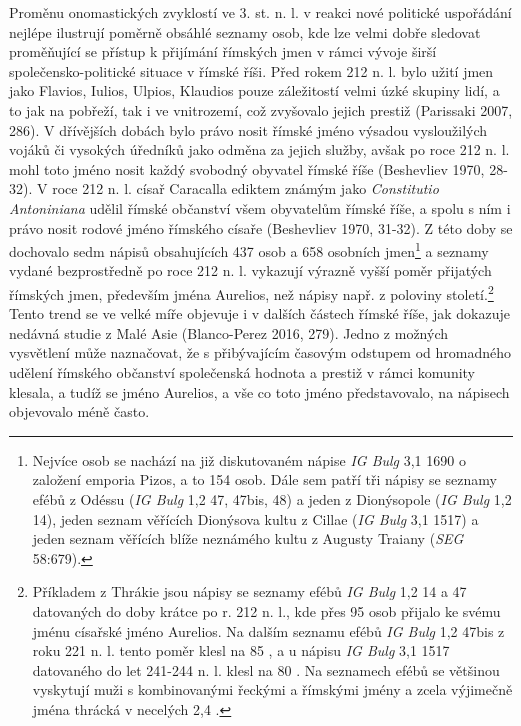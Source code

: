 Proměnu onomastických zvyklostí ve 3. st. n. l. v reakci nové politické uspořádání nejlépe ilustrují poměrně obsáhlé seznamy osob, kde lze velmi dobře sledovat proměňující se přístup k přijímání římských jmen v rámci vývoje širší společensko-politické situace v římské říši. Před rokem 212 n. l. bylo užití jmen jako Flavios, Iulios, Ulpios, Klaudios pouze záležitostí velmi úzké skupiny lidí, a to jak na pobřeží, tak i ve vnitrozemí, což zvyšovalo jejich prestiž (Parissaki 2007, 286). V dřívějších dobách bylo právo nosit římské jméno výsadou vysloužilých vojáků či vysokých úředníků jako odměna za jejich služby, avšak po roce 212 n. l. mohl toto jméno nosit každý svobodný obyvatel římské říše (Beshevliev 1970, 28-32). V roce 212 n. l. císař Caracalla ediktem známým jako {\em Constitutio Antoniniana} udělil římské občanství všem obyvatelům římské říše, a spolu s ním i právo nosit rodové jméno římského císaře (Beshevliev 1970, 31-32). Z této doby se dochovalo sedm nápisů obsahujících 437 osob a 658 osobních jmen\footnote{Nejvíce osob se nachází na již diskutovaném nápise {\em IG Bulg} 3,1 1690 o založení emporia Pizos, a to 154 osob. Dále sem patří tři nápisy se seznamy efébů z Odéssu ({\em IG Bulg} 1,2 47, 47bis, 48) a jeden z Dionýsopole ({\em IG Bulg} 1,2 14), jeden seznam věřících Dionýsova kultu z Cillae ({\em IG Bulg} 3,1 1517) a jeden seznam věřících blíže neznámého kultu z Augusty Traiany ({\em SEG} 58:679).} a seznamy vydané bezprostředně po roce 212 n. l. vykazují výrazně vyšší poměr přijatých římských jmen, především jména Aurelios, než nápisy např. z poloviny století.\footnote{Příkladem z Thrákie jsou nápisy se seznamy efébů {\em IG Bulg} 1,2 14 a 47 datovaných do doby krátce po r. 212 n. l., kde přes 95  osob přijalo ke svému jménu císařské jméno Aurelios. Na dalším seznamu efébů {\em IG Bulg} 1,2 47bis z roku 221 n. l. tento poměr klesl na 85 , a u nápisu {\em IG Bulg} 3,1 1517 datovaného do let 241-244 n. l. klesl na 80 . Na seznamech efébů se většinou vyskytují muži s kombinovanými řeckými a římskými jmény a zcela výjimečně jména thrácká v necelých 2,4 .} Tento trend se ve velké míře objevuje i v dalších částech římské říše, jak dokazuje nedávná studie z Malé Asie (Blanco-Perez 2016, 279). Jedno z možných vysvětlení může naznačovat, že s přibývajícím časovým odstupem od hromadného udělení římského občanství společenská hodnota a prestiž v rámci komunity klesala, a tudíž se jméno Aurelios, a vše co toto jméno představovalo, na nápisech objevovalo méně často.

